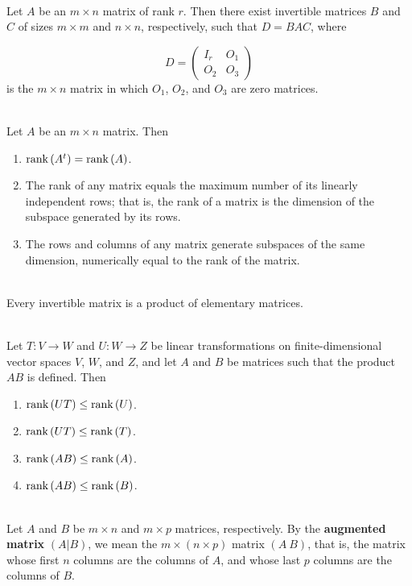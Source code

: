 \begin{corollary}
	\hfill\\
	Let $A$ be an $m \times n$ matrix of rank $r$. Then there exist invertible matrices $B$ and $C$ of sizes $m \times m$ and $n \times n$, respectively, such that $D=BAC$, where
	
	\[D = \begin{pmatrix}
		I_r & O_1 \\
		O_2 & O_3
	\end{pmatrix}\]
	is the $m \times n$ matrix in which $O_1$, $O_2$, and $O_3$ are zero matrices.
\end{corollary}

\begin{corollary}
	\hfill\\
	Let $A$ be an $m \times n$ matrix. Then
	
	\begin{enumerate}
		\item $\text{rank}\left(A^t\right) = \text{rank}\left(A\right)$.
		\item The rank of any matrix equals the maximum number of its linearly independent rows; that is, the rank of a matrix is the dimension of the subspace generated by its rows.
		\item The rows and columns of any matrix generate subspaces of the same dimension, numerically equal to the rank of the matrix.
	\end{enumerate}
\end{corollary}

\begin{corollary}
	\hfill\\
	Every invertible matrix is a product of elementary matrices.
\end{corollary}

\begin{theorem}
	\hfill\\
	Let $T: V \to W$ and $U: W \to Z$ be linear transformations on finite-dimensional vector spaces $V$, $W$, and $Z$, and let $A$ and $B$ be matrices such that the product $AB$ is defined. Then
	
	\begin{enumerate}
		\item $\text{rank}\left(UT\right) \leq \text{rank}\left(U\right)$.
		\item $\text{rank}\left(UT\right) \leq \text{rank}\left(T\right)$.
		\item $\text{rank}\left(AB\right) \leq \text{rank}\left(A\right)$.
		\item $\text{rank}\left(AB\right) \leq \text{rank}\left(B\right)$.
	\end{enumerate}
\end{theorem}

\begin{definition}
	\hfill\\
	Let $A$ and $B$ be $m \times n$ and $m \times p$ matrices, respectively. By the \textbf{augmented matrix} $(A|B)$, we mean the $m \times (n \times p)$ matrix $(A\ B)$, that is, the matrix whose first $n$ columns are the columns of $A$, and whose last $p$ columns are the columns of $B$.
\end{definition}